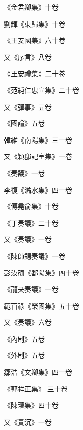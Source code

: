 \begin{pinyinscope}
 《金君卿集》十卷



 劉輝《東歸集》十卷



 《王安國集》六十卷



 又《序言》八卷



 《王安禮集》二十卷



 《范純仁忠宣集》二十卷



 又《彈事》五卷



 《國論》五卷



 韓維《南陽集》三十卷



 又《穎邸記室集》一卷



 《奏議》一卷



 李復《潏水集》四十卷



 《傅堯俞集》十卷



 《丁奏議》二十卷



 又《奏議》一卷



 《陳師錫奏議》一卷



 彭汝礪《鄱陽集》四十卷



 《龍夬奏議》一卷



 範百祿《榮國集》五十卷



 又《奏議》六卷



 《內制》五卷



 《外制》五卷



 鄒浩《文卿集》四十卷



 《郭祥正集》
 三十卷



 《陳瓘集》四十卷



 又《責沉》一卷




\end{pinyinscope}

